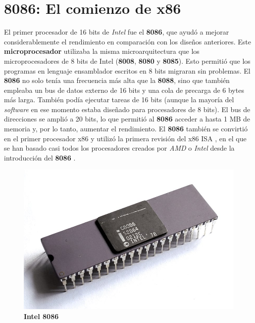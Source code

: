 \section{8086: El comienzo de x86}
El primer procesador de 16 bits de \emph{Intel} fue el \textbf{8086}, que ayudó a mejorar considerablemente el rendimiento en comparación con los diseños anteriores.
Este \textbf{microprocesador} utilizaba la misma microarquitectura que los microprocesadores de 8 bits de Intel (\textbf{8008}, \textbf{8080} y \textbf{8085}). Esto permitió
que los programas en lenguaje ensamblador escritos en 8 bits migraran sin problemas. El \textbf{8086} no solo tenía una frecuencia más alta que la \textbf{8088}, sino que
también empleaba un bus de datos externo de 16 bits y una cola de precarga de 6 bytes más larga. También podía ejecutar tareas de 16 bits (aunque la mayoría del \emph{software} 
en ese momento estaba diseñado para procesadores de 8 bits). El bus de direcciones se amplió a 20 bits, lo que permitió al \textbf{8086} acceder a hasta 1 MB de memoria y,
por lo tanto, aumentar el rendimiento. El \textbf{8086} también se convirtió en el primer procesador x86 y utilizó la primera revisión del x86 ISA ,
en el que se han basado casi todos los procesadores creados por \emph{AMD} o \emph{Intel} desde la introducción del \textbf{8086} 
.

\begin{figure}[htb]
	\centering
	\includegraphics[scale = 0.2]{Graphics/Intel_C8086.jpg}
	\caption{\textbf{Intel 8086}}
	\label{fig:16}
\end{figure}

